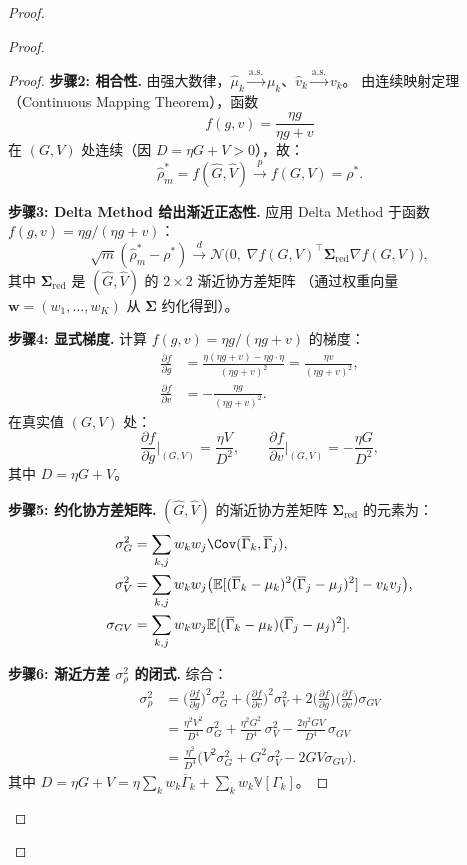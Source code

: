 \documentclass[12pt,a4paper]{article}
\newcommand{\E}{\mathbb{E}}
\newcommand{\V}{\mathbb{V}}
\begin{document}
\begin{proof}
\begin{proof}
\begin{proof}
\textbf{步骤2: 相合性.}
由强大数律，$\hat\mu_k \xrightarrow{\text{a.s.}} \mu_k$、$\hat v_k \xrightarrow{\text{a.s.}} v_k$。
由连续映射定理（Continuous Mapping Theorem），函数
\[
f(g,v) = \frac{\eta g}{\eta g + v}
\]
在 $(G,V)$ 处连续（因 $D = \eta G + V > 0$），故：
\[
\hat\rho^*_m = f(\hat G, \hat V) \xrightarrow{p} f(G, V) = \rho^*.
\]

\textbf{步骤3: Delta Method 给出渐近正态性.}
应用 Delta Method 于函数 $f(g,v) = \eta g/(\eta g+v)$：
\[
\sqrt{m}(\hat\rho^*_m - \rho^*) \xrightarrow{d}
\mathcal{N}\!\big(0,\; \nabla f(G,V)^\top \bm\Sigma_{\text{red}} \nabla f(G,V)\big),
\]
其中 $\bm\Sigma_{\text{red}}$ 是 $(\hat G,\hat V)$ 的 $2\times2$ 渐近协方差矩阵
（通过权重向量 $\bm w = (w_1,\dots,w_K)$ 从 $\bm\Sigma$ 约化得到）。

\textbf{步骤4: 显式梯度.}
计算 $f(g,v) = \eta g/(\eta g+v)$ 的梯度：
\begin{align*}
\frac{\partial f}{\partial g} &= \frac{\eta(\eta g+v) - \eta g\cdot\eta}{(\eta g+v)^2}
= \frac{\eta v}{(\eta g+v)^2},\\
\frac{\partial f}{\partial v} &= -\frac{\eta g}{(\eta g+v)^2}.
\end{align*}
在真实值 $(G,V)$ 处：
\[
\frac{\partial f}{\partial g}\Big|_{(G,V)} = \frac{\eta V}{D^2},\qquad
\frac{\partial f}{\partial v}\Big|_{(G,V)} = -\frac{\eta G}{D^2},
\]
其中 $D = \eta G + V$。

\textbf{步骤5: 约化协方差矩阵.}
$(\hat G, \hat V)$ 的渐近协方差矩阵 $\bm\Sigma_{\text{red}}$ 的元素为：
\begin{align*}
\sigma^2_G &= \sum_{k,j} w_k w_j \Cov(\overline{\Gamma}_k, \overline{\Gamma}_j),\\
\sigma^2_V &= \sum_{k,j} w_k w_j\big(\E[(\overline{\Gamma}_k-\mu_k)^2(\overline{\Gamma}_j-\mu_j)^2] - v_k v_j\big),\\
\sigma_{GV} &= \sum_{k,j} w_k w_j \E[(\overline{\Gamma}_k-\mu_k)(\overline{\Gamma}_j-\mu_j)^2].
\end{align*}

\textbf{步骤6: 渐近方差 $\sigma^2_\rho$ 的闭式.}
综合：
\begin{align*}
\sigma^2_\rho
&= \Big(\frac{\partial f}{\partial g}\Big)^2 \sigma^2_G
+ \Big(\frac{\partial f}{\partial v}\Big)^2 \sigma^2_V
+ 2\Big(\frac{\partial f}{\partial g}\Big)\Big(\frac{\partial f}{\partial v}\Big) \sigma_{GV} \\
&= \frac{\eta^2 V^2}{D^4}\,\sigma^2_G
+ \frac{\eta^2 G^2}{D^4}\,\sigma^2_V
- \frac{2\eta^2 G V}{D^4}\,\sigma_{GV} \\
&= \frac{\eta^2}{D^4}\Big(V^2\sigma^2_G + G^2\sigma^2_V - 2GV\sigma_{GV}\Big).
\end{align*}
其中 $D = \eta G + V = \eta\sum_k w_k\overline{\Gamma}_k + \sum_k w_k\V[\Gamma_k]$。


\end{proof}
\end{proof}
\end{proof}
\end{document}
